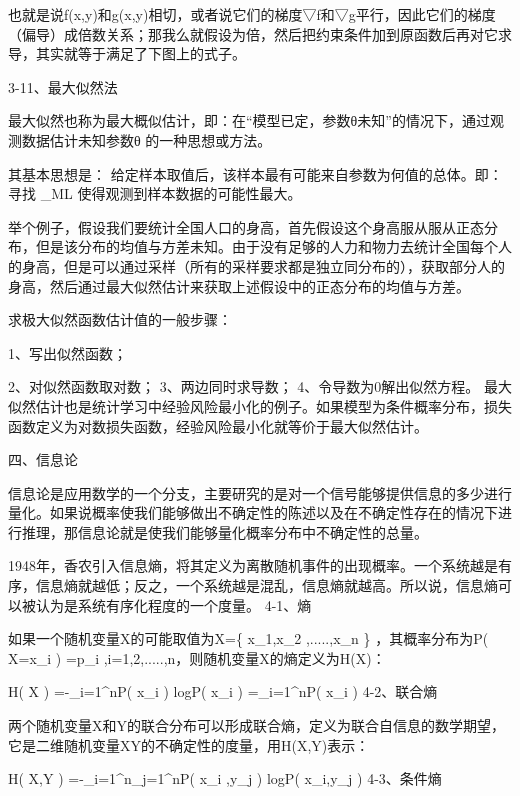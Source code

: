 \documentclass[11pt]{book}
\newcounter{#2}
\newcounter{#2}[#1]
\numberwithin{#2}{#1}
\begin{document}
也就是说f(x,y)和g(x,y)相切，或者说它们的梯度▽f和▽g平行，因此它们的梯度（偏导）成倍数关系；那我么就假设为\lambda 倍，然后把约束条件加到原函数后再对它求导，其实就等于满足了下图上的式子。

3-11、最大似然法

最大似然也称为最大概似估计，即：在“模型已定，参数θ未知”的情况下，通过观测数据估计未知参数θ 的一种思想或方法。

其基本思想是： 给定样本取值后，该样本最有可能来自参数\theta 为何值的总体。即：寻找\tilde{\theta } _{ML} 使得观测到样本数据的可能性最大。

举个例子，假设我们要统计全国人口的身高，首先假设这个身高服从服从正态分布，但是该分布的均值与方差未知。由于没有足够的人力和物力去统计全国每个人的身高，但是可以通过采样（所有的采样要求都是独立同分布的），获取部分人的身高，然后通过最大似然估计来获取上述假设中的正态分布的均值与方差。

求极大似然函数估计值的一般步骤：

1、写出似然函数；

2、对似然函数取对数；
3、两边同时求导数；
4、令导数为0解出似然方程。
最大似然估计也是统计学习中经验风险最小化的例子。如果模型为条件概率分布，损失函数定义为对数损失函数，经验风险最小化就等价于最大似然估计。


四、信息论

信息论是应用数学的一个分支，主要研究的是对一个信号能够提供信息的多少进行量化。如果说概率使我们能够做出不确定性的陈述以及在不确定性存在的情况下进行推理，那信息论就是使我们能够量化概率分布中不确定性的总量。

1948年，香农引入信息熵，将其定义为离散随机事件的出现概率。一个系统越是有序，信息熵就越低；反之，一个系统越是混乱，信息熵就越高。所以说，信息熵可以被认为是系统有序化程度的一个度量。
4-1、熵

如果一个随机变量X的可能取值为X=\left\{ x_{1},x_{2} ,.....,x_{n}   \right\} ，其概率分布为P\left( X=x_{i}  \right) =p_{i} ,i=1,2,.....,n，则随机变量X的熵定义为H(X)：

H\left( X \right) =-\sum_{i=1}^{n}{P\left( x_{i}  \right) logP\left( x_{i}  \right) } =\sum_{i=1}^{n}{P\left( x_{i}  \right)  } 
4-2、联合熵

两个随机变量X和Y的联合分布可以形成联合熵，定义为联合自信息的数学期望，它是二维随机变量XY的不确定性的度量，用H(X,Y)表示：

H\left( X,Y \right) =-\sum_{i=1}^{n}{\sum_{j=1}^{n}{P\left( x_{i} ,y_{j}  \right)} logP\left( x_{i},y_{j}   \right)  } 
4-3、条件熵
\end{document}

